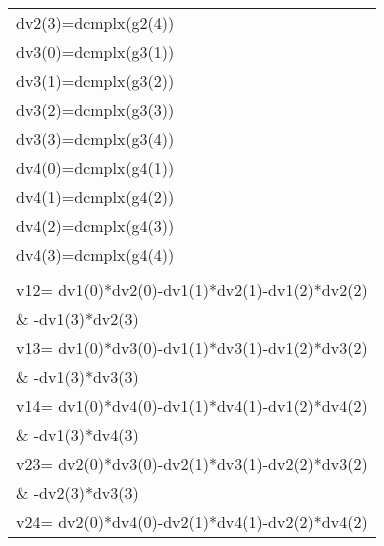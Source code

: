 \begin{center}
{\begin{supertabular}{l}
      \hspace{0.5em} dv2(3)=dcmplx(g2(4))\\
      \hspace{0.5em} dv3(0)=dcmplx(g3(1))\\
      \hspace{0.5em} dv3(1)=dcmplx(g3(2))\\
      \hspace{0.5em} dv3(2)=dcmplx(g3(3))\\
      \hspace{0.5em} dv3(3)=dcmplx(g3(4))\\
      \hspace{0.5em} dv4(0)=dcmplx(g4(1))\\
      \hspace{0.5em} dv4(1)=dcmplx(g4(2))\\
      \hspace{0.5em} dv4(2)=dcmplx(g4(3))\\
      \hspace{0.5em} dv4(3)=dcmplx(g4(4))\\
\\
      \hspace{0.5em} v12= dv1(0)*dv2(0)-dv1(1)*dv2(1)-dv1(2)*dv2(2)\\
      \hspace{0.5em}\& \hspace{1.5em}-dv1(3)*dv2(3)\\
      \hspace{0.5em} v13= dv1(0)*dv3(0)-dv1(1)*dv3(1)-dv1(2)*dv3(2)\\
       \hspace{0.5em}\& \hspace{1.5em}-dv1(3)*dv3(3)\\
      \hspace{0.5em} v14= dv1(0)*dv4(0)-dv1(1)*dv4(1)-dv1(2)*dv4(2)\\
       \hspace{0.5em}\& \hspace{1.5em}-dv1(3)*dv4(3)\\
      \hspace{0.5em} v23= dv2(0)*dv3(0)-dv2(1)*dv3(1)-dv2(2)*dv3(2)\\
       \hspace{0.5em}\& \hspace{1.5em}-dv2(3)*dv3(3)\\
      \hspace{0.5em} v24= dv2(0)*dv4(0)-dv2(1)*dv4(1)-dv2(2)*dv4(2)\\

\end{supertabular}}
\end{center}
